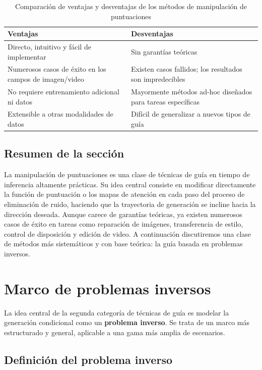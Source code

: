\documentclass[a4paper]{article}
\begin{document}
\begin{table}[H]
\centering
\begin{tabular}{p{}p{}}
\toprule
\textbf{Ventajas} & \textbf{Desventajas} \\
\midrule
Directo, intuitivo y fácil de implementar & Sin garantías teóricas \\
Numerosos casos de éxito en los campos de imagen/video & Existen casos fallidos; los resultados son impredecibles \\
No requiere entrenamiento adicional ni datos & Mayormente métodos ad-hoc diseñados para tareas específicas \\
Extensible a otras modalidades de datos & Difícil de generalizar a nuevos tipos de guía \\
\bottomrule
\end{tabular}
\caption{Comparación de ventajas y desventajas de los métodos de manipulación de puntuaciones}
\end{table}

\subsection{Resumen de la sección}

La manipulación de puntuaciones es una clase de técnicas de guía en tiempo de inferencia altamente prácticas. Su idea central consiste en modificar directamente la función de puntuación o los mapas de atención en cada paso del proceso de eliminación de ruido, haciendo que la trayectoria de generación se incline hacia la dirección deseada. Aunque carece de garantías teóricas, ya existen numerosos casos de éxito en tareas como reparación de imágenes, transferencia de estilo, control de disposición y edición de video. A continuación discutiremos una clase de métodos más sistemáticos y con base teórica: la guía basada en problemas inversos.

\section{Marco de problemas inversos}

La idea central de la segunda categoría de técnicas de guía es modelar la generación condicional como un \textbf{problema inverso}. Se trata de un marco más estructurado y general, aplicable a una gama más amplia de escenarios.

\subsection{Definición del problema inverso}
\end{document}
